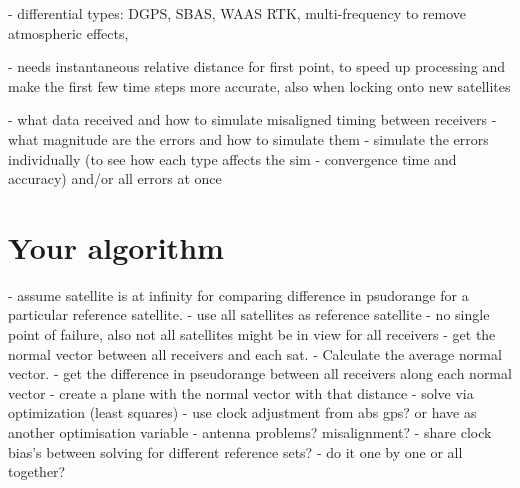\documentclass[11pt,a4paper]{article}
\begin{document}
- differential types: DGPS, SBAS, WAAS RTK, multi-frequency to remove atmospheric effects, 


- needs instantaneous relative distance for first point, to speed up processing and make the first few time steps more accurate, also when locking onto new satellites


- what data received and how to simulate misaligned timing between receivers
- what magnitude are the errors and how to simulate them
- simulate the errors individually (to see how each type affects the sim - convergence time and accuracy) and/or all errors at once







\section{Your algorithm}


- assume satellite is at infinity for comparing difference in psudorange for a particular reference satellite.
- use all satellites as reference satellite - no single point of failure, also not all satellites might be in view for all receivers
- get the normal vector between all receivers and each sat. 
- Calculate the average normal vector.
- get the difference in pseudorange between all receivers along each normal vector 
- create a plane with the normal vector with that distance
- solve via optimization (least squares) 
- use clock adjustment from abs gps? or have as another optimisation variable
- antenna problems? misalignment?
- share clock bias's between solving for different reference sets? - do it one by one or all together?
\end{document}
